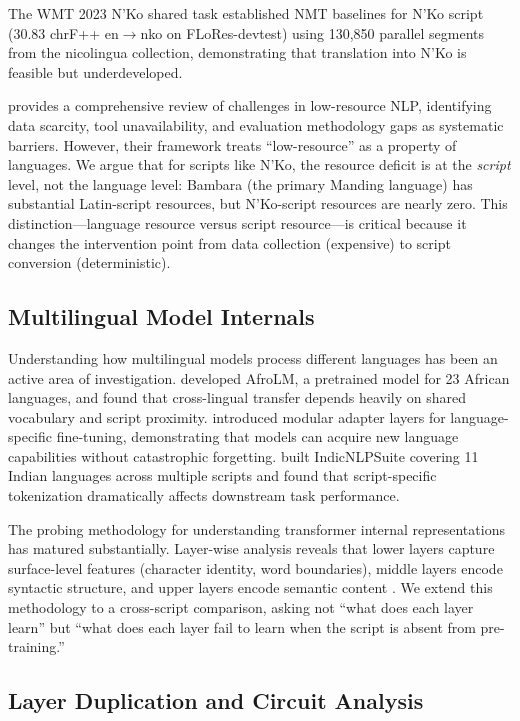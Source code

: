\documentclass[11pt]{article}
\begin{document}
The WMT 2023 N'Ko shared task \cite{wmt2023nko} established NMT baselines for N'Ko script (30.83 chrF++ en$\to$nko on FLoRes-devtest) using 130,850 parallel segments from the nicolingua collection, demonstrating that translation into N'Ko is feasible but underdeveloped.

\citet{magueresse2020lowresource} provides a comprehensive review of challenges in low-resource NLP, identifying data scarcity, tool unavailability, and evaluation methodology gaps as systematic barriers.
However, their framework treats ``low-resource'' as a property of languages.
We argue that for scripts like N'Ko, the resource deficit is at the \emph{script} level, not the language level: Bambara (the primary Manding language) has substantial Latin-script resources, but N'Ko-script resources are nearly zero.
This distinction---language resource versus script resource---is critical because it changes the intervention point from data collection (expensive) to script conversion (deterministic).

\subsection{Multilingual Model Internals}

Understanding how multilingual models process different languages has been an active area of investigation.
\citet{dossou2022afrolm} developed AfroLM, a pretrained model for 23 African languages, and found that cross-lingual transfer depends heavily on shared vocabulary and script proximity.
\citet{pfeiffer2020adapterhub} introduced modular adapter layers for language-specific fine-tuning, demonstrating that models can acquire new language capabilities without catastrophic forgetting.
\citet{kakwani2020indicnlpsuite} built IndicNLPSuite covering 11 Indian languages across multiple scripts and found that script-specific tokenization dramatically affects downstream task performance.

The probing methodology for understanding transformer internal representations has matured substantially.
Layer-wise analysis reveals that lower layers capture surface-level features (character identity, word boundaries), middle layers encode syntactic structure, and upper layers encode semantic content \cite{tenney2019bert}.
We extend this methodology to a cross-script comparison, asking not ``what does each layer learn'' but ``what does each layer fail to learn when the script is absent from pre-training.''

\subsection{Layer Duplication and Circuit Analysis}
\end{document}
